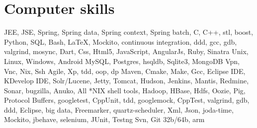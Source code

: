 


\section{Computer skills}

    {JEE, JSE, Spring, Spring data, Spring context, Spring batch, C, C++, stl,
    boost, Python, SQL, Bash, \LaTeX, Mockito, continuous integration, ddd, gcc,
    gdb, valgrind, mosync, Dart, Css, Html5, JavaScript, AngularJs, Ruby,
    Sinatra} {}{}{}{}
    {Unix, Linux, Windows, Android}
    {}{}{}{}
    {MySQL, Postgres, hsqldb, Sqlite3, MongoDB}
    {}{}{}{}
    {Vpn, Vnc, Nix, Ssh}
    {}{}{}{}
    {Agile, Xp, tdd, oop, dp}
    {}{}{}{}
    {Maven, Cmake, Make, Gcc, Eclipse IDE, KDevelop IDE, Solr/Lucene,
    Jetty, Tomcat, Hudson, Jenkins, Mantis, Redmine,
    Sonar, bugzilla, Anuko, All *NIX shell tools, Hadoop, HBase, Hdfs, Oozie, Pig,
    Protocol Buffers, googletest, CppUnit, tdd, googlemock, CppTest, valgrind, gdb,
    ddd, Eclipse, big data, Freemarker, quartz-scheduler, Xml, Json, joda-time,
    Mockito, jbehave, selenium, JUnit, Testng} {}{}{}{}
    {Svn, Git}
    {}{}{}{}
    {32b/64b, arm}
    {}{}{}{}
